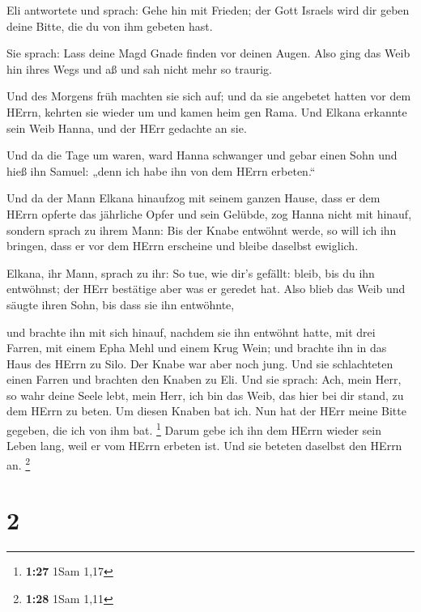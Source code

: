  Eli antwortete und sprach: Gehe hin mit Frieden; der Gott
Israels wird dir geben deine Bitte, die du von ihm gebeten hast.

 Sie sprach: Lass deine Magd Gnade finden vor deinen Augen.
Also ging das Weib hin ihres Wegs und aß und sah nicht mehr so traurig.

 Und des Morgens früh machten sie sich auf; und da sie
angebetet hatten vor dem HErrn, kehrten sie wieder um und kamen heim gen
Rama. Und Elkana erkannte sein Weib Hanna, und der HErr gedachte an sie.

 Und da die Tage um waren, ward Hanna schwanger und gebar
einen Sohn und hieß ihn Samuel: „denn ich habe ihn von dem HErrn
erbeten.``

 Und da der Mann Elkana hinaufzog mit seinem ganzen Hause,
dass er dem HErrn opferte das jährliche Opfer und sein Gelübde,
 zog Hanna nicht mit hinauf, sondern sprach zu ihrem Mann:
Bis der Knabe entwöhnt werde, so will ich ihn bringen, dass er vor dem
HErrn erscheine und bleibe daselbst ewiglich.

 Elkana, ihr Mann, sprach zu ihr: So tue, wie dir's
gefällt: bleib, bis du ihn entwöhnst; der HErr bestätige aber was er
geredet hat. Also blieb das Weib und säugte ihren Sohn, bis dass sie ihn
entwöhnte,

 und brachte ihn mit sich hinauf, nachdem sie ihn entwöhnt
hatte, mit drei Farren, mit einem Epha Mehl und einem Krug Wein; und
brachte ihn in das Haus des HErrn zu Silo. Der Knabe war aber noch jung.
 Und sie schlachteten einen Farren und brachten den Knaben
zu Eli.  Und sie sprach: Ach, mein Herr, so wahr deine
Seele lebt, mein Herr, ich bin das Weib, das hier bei dir stand, zu dem
HErrn zu beten.  Um diesen Knaben bat ich. Nun hat der HErr
meine Bitte gegeben, die ich von ihm bat. \footnote{\textbf{1:27} 1Sam
  1,17}  Darum gebe ich ihn dem HErrn wieder sein Leben
lang, weil er vom HErrn erbeten ist. Und sie beteten daselbst den HErrn
an. \footnote{\textbf{1:28} 1Sam 1,11}

\hypertarget{section-1}{%
\section{2}\label{section-1}}

